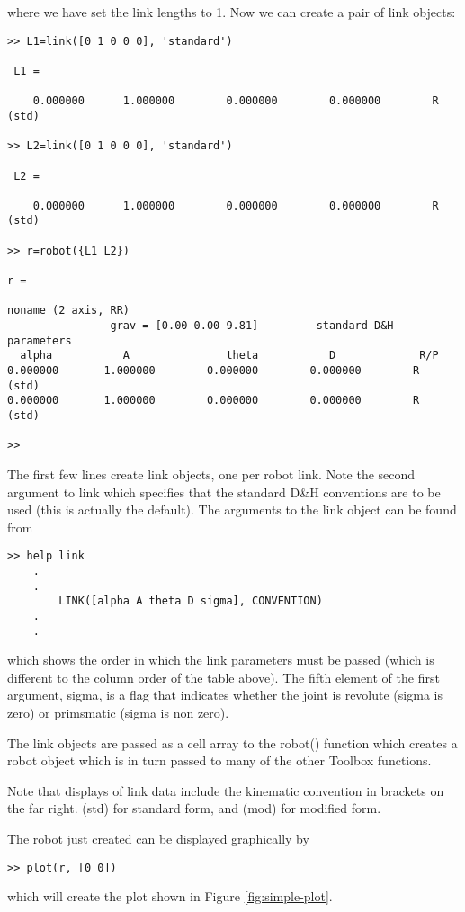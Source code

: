 \documentclass{article}
\newcommand{\var}[1]{{\vtt #1}}
\begin{document}
where we have set the link lengths to 1.  Now we can create a pair of
link objects:
\begin{verbatim}
>> L1=link([0 1 0 0 0], 'standard') 
 
 L1 = 
  
    0.000000      1.000000        0.000000        0.000000        R    (std)
     
>> L2=link([0 1 0 0 0], 'standard')
      
 L2 = 
       
    0.000000      1.000000        0.000000        0.000000        R    (std)

>> r=robot({L1 L2})                
 
r = 
 
noname (2 axis, RR)
                grav = [0.00 0.00 9.81]         standard D&H parameters
  alpha           A               theta           D             R/P
0.000000       1.000000        0.000000        0.000000        R    (std)
0.000000       1.000000        0.000000        0.000000        R    (std)

>>
\end{verbatim}
The first few lines create link objects, one per robot link.
Note the second argument to \var{link} which specifies that the standard
D\&H conventions are to be used (this is actually the default).
The arguments to the link object can be found from
\begin{verbatim}
>> help link
    .
    .
        LINK([alpha A theta D sigma], CONVENTION)
    .
    .
\end{verbatim}
which shows the order in which the link parameters must be passed (which
is different to the column order of the table above).
The fifth element of the first argument, \var{sigma}, is a flag that 
indicates whether the
joint is revolute (\var{sigma} is zero) or primsmatic (\var{sigma} is non zero).

The link objects are passed as a cell array to the \var{robot()} function
which creates a robot object which is in turn passed to many of the 
other Toolbox functions.

Note that displays of link data include the kinematic convention in
brackets on the far right.  \var{(std)} for standard form, and 
\var{(mod)} for modified form.

The robot just created can be displayed graphically by
\begin{verbatim}
>> plot(r, [0 0])
\end{verbatim}
which will create the plot shown in Figure \ref{fig:simple-plot}.
\end{document}
